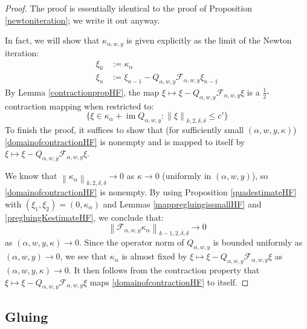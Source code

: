 \documentclass[12pt]{article}
\theoremstyle{definition}
\theoremstyle{remark}
\numberwithin{equation}{subsection}
\newcommand{\F}{\mathcal F}
\newcommand{\im}{\operatorname{im}}
\begin{document}
\begin{proof}
The proof is essentially identical to the proof of Proposition \ref{newtoniteration}; we write it out anyway.

In fact, we will show that $\kappa_{\alpha,w,y}$ is given explicitly as the limit of the Newton iteration:
\begin{align}
\xi_0&:=\kappa_\alpha\\
\xi_n&:=\xi_{n-1}-Q_{\alpha,w,y}\F_{\alpha,w,y}\xi_{n-1}
\end{align}
By Lemma \ref{contractionpropHF}, the map $\xi\mapsto\xi-Q_{\alpha,w,y}\F_{\alpha,w,y}\xi$ is a $\frac 12$-contraction mapping when restricted to:
\begin{equation}\label{domainofcontractionHF}
\{\xi\in\kappa_\alpha+\im Q_{\alpha,w,y}:\left\|\xi\right\|_{k,2,\delta,\delta}\leq c'\}
\end{equation}
To finish the proof, it suffices to show that (for sufficiently small $(\alpha,w,y,\kappa)$) \eqref{domainofcontractionHF} is nonempty and is mapped to itself by $\xi\mapsto\xi-Q_{\alpha,w,y}\F_{\alpha,w,y}\xi$.

We know that $\left\|\kappa_\alpha\right\|_{k,2,\delta,\delta}\to 0$ as $\kappa\to 0$ (uniformly in $(\alpha,w,y)$), so \eqref{domainofcontractionHF} is nonempty.  By using Proposition \ref{quadestimateHF} with $(\xi_1,\xi_2)=(0,\kappa_\alpha)$ and Lemmas \ref{mappregluingissmallHF} and \ref{pregluingKestimateHF}, we conclude that:
\begin{equation}\label{kernelclosetoholomorphicHF}
\left\|\F_{\alpha,w,y}\kappa_\alpha\right\|_{k-1,2,\delta,\delta}\to 0
\end{equation}
as $(\alpha,w,y,\kappa)\to 0$.  Since the operator norm of $Q_{\alpha,w,y}$ is bounded uniformly as $(\alpha,w,y)\to 0$, we see that $\kappa_\alpha$ is almost fixed by $\xi\mapsto\xi-Q_{\alpha,w,y}\F_{\alpha,w,y}\xi$ as $(\alpha,w,y,\kappa)\to 0$.  It then follows from the contraction property that $\xi\mapsto\xi-Q_{\alpha,w,y}\F_{\alpha,w,y}\xi$ maps \eqref{domainofcontractionHF} to itself.
\end{proof}

\subsection{Gluing}
\end{document}

